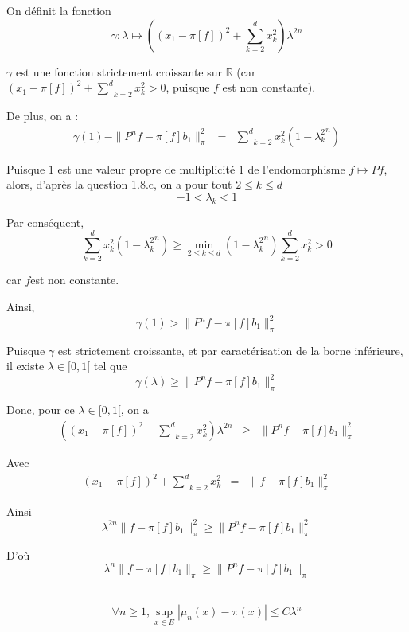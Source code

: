 On d{\'e}finit la fonction
\[ \gamma : \lambda \longmapsto \left( (x_1 - \pi [f])^2 + \underset{k =
   2}{\overset{d}{\sum}} x^2_k \right) \lambda^{2 n} \]


$\gamma$ est une fonction strictement croissante sur $\mathbb{R}$ (car $(x_1 -
\pi [f])^2 + \underset{k = 2}{\overset{d}{\sum}} x^2_k > 0$, puisque $f$ est
non constante).

De plus, on a :
\begin{eqnarray*}
  \gamma (1) - \| P^n f - \pi [f] b_1 \|^2_{\pi} & = & \underset{k =
  2}{\overset{d}{\sum}} x^2_k \left( {1 - \lambda^2_k}^n \right)
\end{eqnarray*}


Puisque $1$ est une valeur propre de multiplicit{\'e} $1$ de l'endomorphisme
$f \longmapsto P f$, alors, d'apr{\`e}s la question 1.8.c, on a pour tout $2
\leqslant k \leqslant d$
\[ - 1 < \lambda_k < 1 \]


Par cons{\'e}quent,
\[ \underset{k = 2}{\overset{d}{\sum}} x^2_k \left( {1 - \lambda^2_k}^n
   \right) \geqslant \underset{2 \leqslant k \leqslant d}{\min} \left( {1 -
   \lambda^2_k}^n \right) \underset{k = 2}{\overset{d}{\sum}} x^2_k > 0 \]


car $f$est non constante.

Ainsi,
\[ \gamma (1) > \| P^n f - \pi [f] b_1 \|^2_{\pi} \]


Puisque $\gamma$ est strictement croissante, et par caract{\'e}risation de la
borne inf{\'e}rieure, il existe $\lambda \in [0, 1 [$ tel que
\[ \gamma (\lambda) \geqslant \| P^n f - \pi [f] b_1 \|^2_{\pi} \]


Donc, pour ce $\lambda \in [0, 1 [$, on a
\begin{eqnarray*}
  \left( (x_1 - \pi [f])^2 + \underset{k = 2}{\overset{d}{\sum}} x^2_k \right)
  \lambda^{2 n} & \geqslant & \| P^n f - \pi [f] b_1 \|^2_{\pi}
\end{eqnarray*}


Avec
\begin{eqnarray*}
  (x_1 - \pi [f])^2 + \underset{k = 2}{\overset{d}{\sum}} x^2_k & = & \| f -
  \pi [f] b_1 \|^2_{\pi}
\end{eqnarray*}


Ainsi
\[ \lambda^{2 n} \| f - \pi [f] b_1 \|^2_{\pi} \geqslant \| P^n f - \pi [f]
   b_1 \|^2_{\pi} \]


D'o{\`u}
\[ \lambda^n \| f - \pi [f] b_1 \| _{\pi} \geqslant \| P^n f - \pi [f] b_1 \|
   _{\pi} \]


 \\
\[ \forall n \geqslant 1, \underset{x \in E}{\sup} | \mu_n (x) - \pi (x) |
   \leqslant C \lambda^n \]

